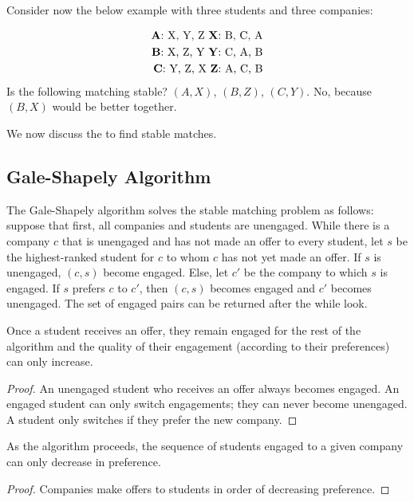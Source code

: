 \documentclass[12pt]{scrartcl}
\begin{document}
Consider now the below example with three students and three companies:
\begin{example}
\begin{align*}
    \text{\textbf{A}: X, Y, Z} \ \text{\textbf{X}: B, C, A} \\
    \text{\textbf{B}: X, Z, Y} \ \text{\textbf{Y}: C, A, B} \\
    \text{\textbf{C}: Y, Z, X} \ \text{\textbf{Z}: A, C, B}
\end{align*}
Is the following matching stable? $(A, X)$, $(B, Z)$, $(C, Y)$. No, because $(B, X)$ would be better together.
\end{example}

We now discuss the  to find stable matches.

\subsection{Gale-Shapely Algorithm}
The Gale-Shapely algorithm solves the stable matching problem as follows: suppose that first, all companies and students are unengaged. While there is a company $c$ that is unengaged and has not made an offer to every student, let $s$ be the highest-ranked student for $c$ to whom $c$ has not yet made an offer. If $s$ is unengaged, $(c, s)$ become engaged. Else, let $c'$ be the company to which $s$ is engaged. If $s$ prefers $c$ to $c'$, then $(c, s)$ becomes engaged and $c'$ becomes unengaged. The set of engaged pairs can be returned after the while look.

\begin{lemma}
    Once a student receives an offer, they remain engaged for the rest of the algorithm and the quality of their engagement (according to their preferences) can only increase.
\end{lemma}

\begin{proof}
    An unengaged student who receives an offer always becomes engaged. An engaged student can only switch engagements; they can never become unengaged. A student only switches if they prefer the new company.
\end{proof}

\begin{lemma}
    As the algorithm proceeds, the sequence of students engaged to a given company can only decrease in preference.
\end{lemma}

\begin{proof}
    Companies make offers to students in order of decreasing preference.
\end{proof}
\end{document}
